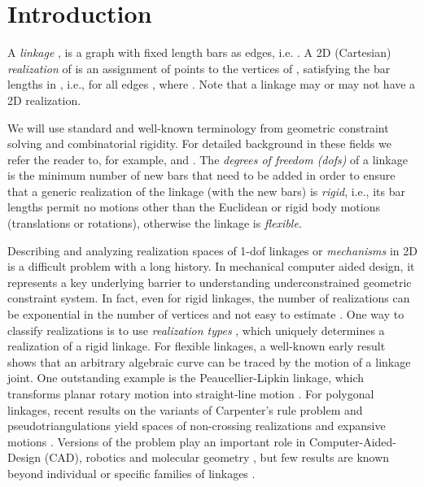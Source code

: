 \documentclass[secthm,amsthm,english]{article}
\theoremstyle{definition}
\theoremstyle{remark}
\begin{document}
\begin{abstract}
\end{abstract}

\section{Introduction}
\label{sec:introduction}



A {\em linkage} , is a graph  with fixed
length bars as edges, i.e. . 
A 2D (Cartesian) \emph{realization}  of  is an assignment of points  to the vertices of , 
satisfying the bar lengths in , i.e., for all edges ,  where .
Note that a linkage may or may not have a 2D realization.

We will use standard and well-known terminology from geometric constraint solving and combinatorial rigidity. 
For detailed background in these fields we refer the reader to, for example,
\cite{bib:Graver} and \cite{bib:survey}.
 The \emph{degrees of freedom (dofs)} of a linkage
 is the minimum number of new bars that need to be added 
in order to ensure that a generic realization of the linkage (with the new bars) is \emph{rigid}, 
i.e., its bar lengths permit no motions other than the Euclidean or rigid body motions (translations or rotations), 
otherwise the linkage is \emph{flexible}. 






Describing and analyzing realization spaces of 1-dof linkages
or \emph{mechanisms} in 2D is 
a  difficult problem with a long history. 
In mechanical computer aided design, it represents a key underlying barrier
to understanding underconstrained geometric constraint system.
In fact, even for rigid linkages, the number of realizations can be exponential in the number of vertices
and not easy to estimate \cite{bib:Borcea}. 
One way to classify realizations is to use \emph{realization types} \cite{bib:navigation,bib:FudHo97},  
which uniquely determines a realization of a rigid linkage. 
For flexible linkages, 
a well-known early result \cite{kempe1875} 
shows that an arbitrary algebraic curve can be traced by the motion of a linkage joint. 
One outstanding example is the Peaucellier-Lipkin linkage, which transforms planar rotary motion into straight-line motion \cite{bib:Kempe}. 
For polygonal linkages, recent results on the variants of Carpenter's rule problem and pseudotriangulations yield spaces of non-crossing realizations and expansive motions \cite{bib:streinu05,streinu2000combinatorail,bib:straightening,bib:rote03}.
Versions of the problem play an important role in Computer-Aided-Design (CAD), 
robotics and molecular geometry \cite{bib:sacks10,bib:Yang,bib:survey}, but few results are known beyond individual or specific families of linkages \cite{bib:JoanArinyo03,bib:hilderick06,bib:henneberg,bib:ZhangGao06}. 
\end{document}
